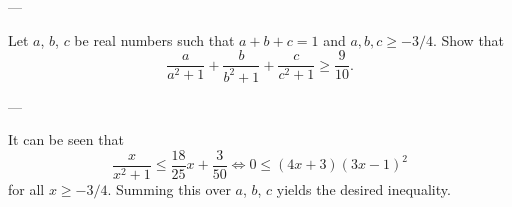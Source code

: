 
---

Let $a$, $b$, $c$ be real numbers such that $a+b+c=1$ and $a,b,c\ge-3/4$. Show that \[\frac a{a^2+1}+\frac b{b^2+1}+\frac c{c^2+1}\ge\frac9{10}.\]

---

It can be seen that \[\frac x{x^2+1}\le\frac{18}{25}x+\frac3{50}\iff0\le(4x+3)(3x-1)^2\]
for all $x\ge-3/4$. Summing this over $a$, $b$, $c$ yields the desired inequality.
